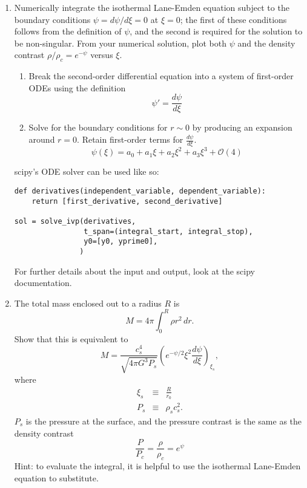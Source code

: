 \documentclass[twoside]{tufte-book} %
\begin{document}
\begin{enumerate}
\item Numerically integrate the isothermal Lane-Emden equation subject to the
    boundary conditions $\psi=d\psi/d\xi = 0$ at $\xi=0$; the first of these
    conditions follows from the definition of $\psi$, and the second is
    required for the solution to be non-singular. From your numerical solution,
    plot both $\psi$ and the density contrast $\rho/\rho_c = e^{-\psi}$ versus
    $\xi$.

    \begin{enumerate}
        \item Break the second-order differential equation into a system of first-order ODEs using the definition
    $$ \psi ' = \frac{d\psi}{d\xi} $$
        \item Solve for the boundary conditions for $r\sim0$ by producing an expansion around $r=0$.
            Retain first-order terms for $\frac{d \psi}{d\xi}$.
            $$ \psi(\xi) = a_0 + a_1 \xi + a_2 \xi^2 + a_3 \xi^3 + \mathcal{O}(4)$$
    \end{enumerate}

    scipy's ODE solver can be used like so:
\begin{verbatim}
def derivatives(independent_variable, dependent_variable):
    return [first_derivative, second_derivative]

sol = solve_ivp(derivatives,
                t_span=(integral_start, integral_stop),
                y0=[y0, yprime0],
               )
\end{verbatim}

For further details about the input and output, look at the scipy documentation.



\item The total mass enclosed out to a radius $R$ is
\begin{displaymath}
M = 4\pi \int_0^R \rho r^2 \, dr.
\end{displaymath}
Show that this is equivalent to
\begin{displaymath}
M =\frac{c_s^4}{\sqrt{4\pi G^3 P_s}} \left(e^{-\psi/2}\xi^2 \frac{d\psi}{d\xi}\right)_{\xi_s},
\end{displaymath}
where
\begin{eqnarray*}
\xi_s & \equiv & \frac{R}{r_0} \\
P_s & \equiv & \rho_s c_s^2.
\end{eqnarray*}
$P_s$ is the pressure at the surface, and the pressure contrast is the same as the density contrast $$\frac{P}{P_c} = \frac{\rho}{\rho_c} = e^\psi$$
Hint: to evaluate the integral, it is helpful to use the isothermal Lane-Emden equation to substitute.



\end{enumerate}
\end{document}
